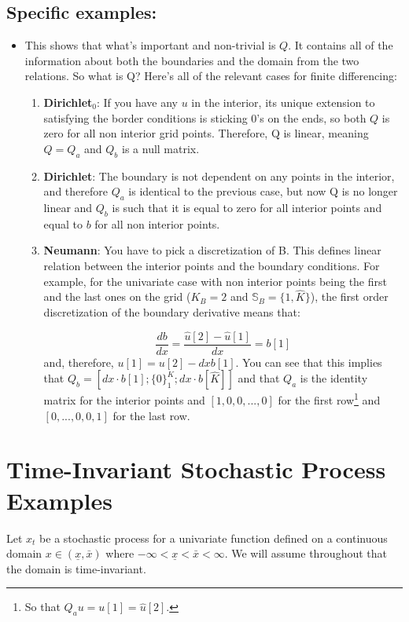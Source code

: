 \documentclass[11pt]{article}
\begin{document}
	\subsection{Specific examples:}
	\begin{itemize}
		\item This shows that what's important and non-trivial is $Q$. It contains all of the information about both the boundaries and the domain from the two relations. So what is Q? Here's all of the relevant cases for finite differencing:
		\begin{enumerate}
			\item \textbf{Dirichlet$_0$}: If you have any $u$ in the interior, its unique extension to satisfying the border conditions is sticking $0$'s on the ends, so both $Q$ is zero for all non interior grid points. Therefore, Q is linear, meaning $Q = Q_a$ and $Q_b$ is a null matrix.
			
			\item \textbf{Dirichlet}: The boundary is not dependent on any points in the interior, and therefore $Q_a$ is identical to the previous case, but now Q is no longer linear and
	 		$Q_b$ is such that it is equal to zero for all interior points and equal to $b$ for all non interior points.
			
			\item \textbf{Neumann}: You have to pick a discretization of B. This defines linear relation between the interior points and the boundary conditions. For example, for the univariate case with non interior points being the first and the last ones on the grid ($K_B = 2$ and $\mathbb{S}_B = \{1,\hat{K}\}$), the first order discretization of the boundary derivative means that: 
			
			\begin{equation}
				\frac{db}{dx} = \frac{\hat{u}[2] - \hat{u}[1]}{dx} = b[1]
			\end{equation}
			and, therefore, $u[1] = u[2] - dx b[1]$. You can see that this implies that $Q_b = [dx\cdot b[1];\{0\}_1^K;dx\cdot b[\hat{K}]]$ and that $Q_a$ is the identity matrix for the interior points and $[1,0, 0,...,0]$ for the first row\footnote{So that $Q_a u = u[1] = \hat{u}[2]$.} and $[0,...,0,0,1]$ for the last row.%
			
		\end{enumerate}
	\end{itemize}

\section{Time-Invariant Stochastic Process Examples}
Let $x_t$ be a stochastic process for a univariate function defined on a continuous domain $x \in (\underline{x}, \bar{x})$ where $-\infty < \underline{x} < \bar{x} < \infty$.  We will assume throughout that the domain is time-invariant.
\end{document}
